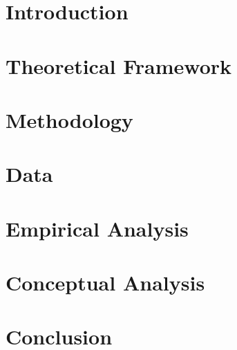 \documentclass[12pt,a4paper]{report}
\begin{document}


\tableofcontents

\chapter{Introduction}



\chapter{Theoretical Framework}



\chapter{Methodology}



\chapter{Data}



\chapter{Empirical Analysis}



\chapter{Conceptual Analysis}



\chapter{Conclusion}



\printbibliography
\end{document}
